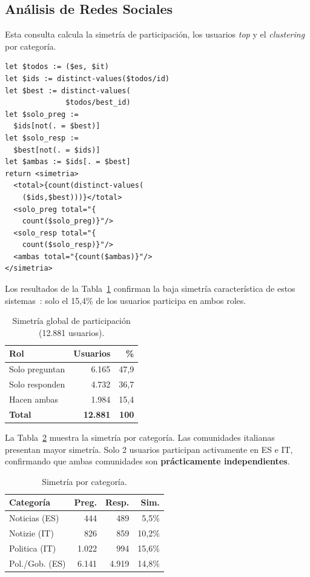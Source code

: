 \documentclass[10pt,twocolumn,a4paper]{article}
\begin{document}
\subsection{An\'alisis de Redes Sociales}

Esta consulta calcula la simetr\'ia de participaci\'on, los usuarios
\textit{top} y el \textit{clustering} por categor\'ia.

\begin{lstlisting}[language=XQuery,caption={Calculo de simetria.}, xleftmargin=0.5cm]
let $todos := ($es, $it)
let $ids := distinct-values($todos/id)
let $best := distinct-values(
              $todos/best_id)
let $solo_preg :=
  $ids[not(. = $best)]
let $solo_resp :=
  $best[not(. = $ids)]
let $ambas := $ids[. = $best]
return <simetria>
  <total>{count(distinct-values(
    ($ids,$best)))}</total>
  <solo_preg total="{
    count($solo_preg)}"/>
  <solo_resp total="{
    count($solo_resp)}"/>
  <ambas total="{count($ambas)}"/>
</simetria>
\end{lstlisting}

Los resultados de la Tabla~\ref{tab:simetria} confirman la baja
simetr\'ia caracter\'istica de estos sistemas~\cite{shen2015}:
solo el 15,4\% de los usuarios participa en ambos roles.

\begin{table}[H]
\centering
\caption{Simetr\'ia global de participaci\'on (12.881 usuarios).}
\label{tab:simetria}
\begin{tabular}{lrr}
\toprule
\textbf{Rol} & \textbf{Usuarios} & \textbf{\%} \\
\midrule
Solo preguntan & 6.165 & 47,9 \\
Solo responden & 4.732 & 36,7 \\
Hacen ambas    & 1.984 & 15,4 \\
\midrule
\textbf{Total} & \textbf{12.881} & \textbf{100} \\
\bottomrule
\end{tabular}
\end{table}

La Tabla~\ref{tab:simetria_cat} muestra la simetr\'ia por categor\'ia.
Las comunidades italianas presentan mayor simetr\'ia. Solo 2 usuarios
participan activamente en ES e IT, confirmando que ambas comunidades
son \textbf{pr\'acticamente independientes}.

\begin{table}[H]
\centering
\caption{Simetr\'ia por categor\'ia.}
\label{tab:simetria_cat}
\begin{tabular}{p{2.1cm}rrr}
\toprule
\textbf{Categor\'ia} & \textbf{Preg.} & \textbf{Resp.} & \textbf{Sim.} \\
\midrule
Noticias (ES)  &   444 &   489 &  5,5\% \\
Notizie (IT)   &   826 &   859 & 10,2\% \\
Politica (IT)  & 1.022 &   994 & 15,6\% \\
Pol./Gob. (ES) & 6.141 & 4.919 & 14,8\% \\
\bottomrule
\end{tabular}
\end{table}
\end{document}
